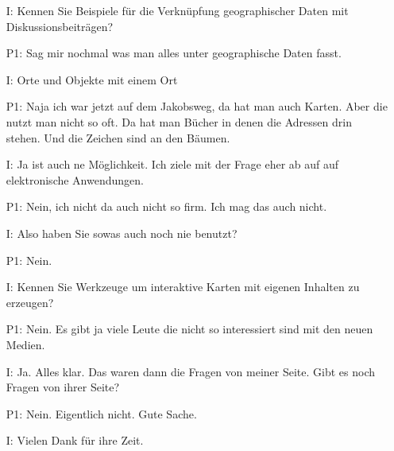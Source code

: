 \documentclass{sigchi}
\begin{document}
\begin{itemize}
    \item[I:] Kennen Sie Beispiele f{\"u}r die Verkn{\"u}pfung geographischer Daten mit Diskussionsbeitr{\"a}gen?
	\item[P1:] Sag mir nochmal was man alles unter geographische Daten fasst.
	\item[I:] Orte und Objekte mit einem Ort
	\item[P1:] Naja ich war jetzt auf dem Jakobsweg, da hat man auch Karten. Aber die nutzt man nicht so oft. Da hat man B{\"u}cher in denen die Adressen drin stehen. Und die Zeichen sind an den B{\"a}umen.
	\item[I:] Ja ist auch ne M{\"o}glichkeit. Ich ziele mit der Frage eher ab auf auf elektronische Anwendungen.
	\item[P1:] Nein, ich nicht da auch nicht so firm. Ich mag das auch nicht.
	\item[I:] Also haben Sie sowas auch noch nie benutzt?
	\item[P1:] Nein.
	\item[I:] Kennen Sie Werkzeuge um interaktive Karten mit eigenen Inhalten zu erzeugen?
	\item[P1:] Nein. Es gibt ja viele Leute die nicht so interessiert sind mit den neuen Medien. 
	\item[I:] Ja. Alles klar. Das waren dann die Fragen von meiner Seite. Gibt es noch Fragen von ihrer Seite? 
    \item[P1:] Nein. Eigentlich nicht. Gute Sache.
    \item[I:] Vielen Dank f{\"u}r ihre Zeit.
\end{itemize}
\end{document}
